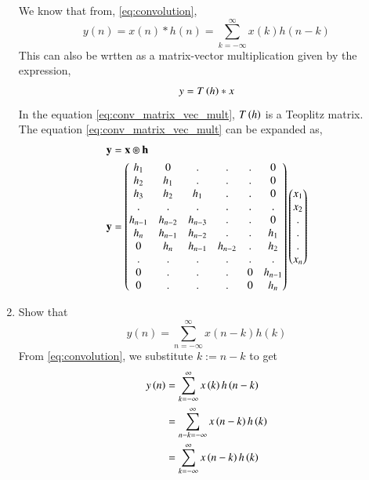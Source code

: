 \documentclass[journal,12pt,twocolumn]{IEEEtran}
\renewcommand\thesection{\arabic{section}}
\begin{document}
\begin{enumerate}[label=\thesection.\arabic*]
We know that from, \eqref{eq:convolution},
\begin{equation}
	y(n) = x(n)*h(n) = \sum_{k=-\infty}^{\infty}x(k)h(n-k)
\end{equation}
This can also be wrtten as a matrix-vector multiplication given by the expression,
\begin{equation}
	\label{eq:conv_matrix_vec_mult}
	y = T\left(h\right)*x
\end{equation}
In the equation \eqref{eq:conv_matrix_vec_mult}, $T\left(h\right)$ is a Teoplitz matrix.
\\ The equation \eqref{eq:conv_matrix_vec_mult} can be expanded as,
\begin{align}
	\mathbf{y} &= \mathbf{x} \circledast \mathbf{h}\\
	\mathbf{y} &= 
	\begin{pmatrix}
		h_1 & 0 & . & . & . & 0 \\
		h_2 & h_1 & . & . & . & 0 \\
		h_3 & h_2 & h_1 & . & . & 0 \\
		. & . & . & . & . & . \\
		h_{n-1} & h_{n-2} & h_{n-3} & . & . & 0\\
		h_{n} & h_{n-1} & h_{n-2} & . & . & h_1\\
		0 & h_{n} & h_{n-1} & h_{n-2} & . & h_2\\
		. & . & . & . & . & . \\
		0 & . & . & . & 0 & h_{n-1} \\
		0 & . & . & . & 0 & h_n \\
	\end{pmatrix}
	\begin{pmatrix}
		x_1 \\ x_2 \\ .\\.\\. \\ x_n
	\end{pmatrix}
\end{align}
\item Show that
\begin{equation}
y(n) =  \sum_{n=-\infty}^{\infty}x(n-k)h(k)
\end{equation}
\solution
From \eqref{eq:convolution}, we substitute $k := n - k$ to get
\begin{align}
y\left(n\right) &= \sum_{k=-\infty}^{\infty}x\left(k\right)h\left(n - k\right) \\
		  &= \sum_{n - k=-\infty}^{\infty}x\left(n - k\right)h\left(k\right) \\
		  &= \sum_{k=-\infty}^{\infty}x\left(n - k\right)h\left(k\right)
\end{align}
\end{enumerate}
\end{document}
